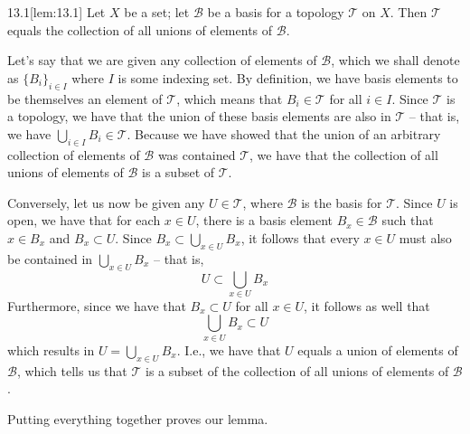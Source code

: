 \begin{thmBox}[Lemma]{13.1}[lem:13.1]
    Let \( X \) be a set; let \( \mathcal{B} \) be a basis for a topology 
    \( \mathcal{T} \) on \( X \). Then \( \mathcal{T} \) equals the collection 
    of all unions of elements of \( \mathcal{B} \). 

    \baseRule

    \begin{proofBox}
        Let's say that we are given any collection of elements of 
        \( \mathcal{B} \), which we shall denote as 
        \( \{ B_{ i } \}_{ i \in I } \) where \( I \) is some indexing set. 
        By definition, we have basis elements to be themselves an element of 
        \( \mathcal{T} \), which means that \( B_{ i } \in \mathcal{T} \) 
        for all \( i \in I \).
        Since \( \mathcal{T} \) is a topology, we have that the union of these 
        basis elements are also in \( \mathcal{T} \) -- that is, we have 
        \( \bigcup_{ i \in I } B_{ i } \in \mathcal{T} \).
        Because we have showed that the union of an arbitrary collection of 
        elements of \( \mathcal{B} \) was contained \( \mathcal{T} \), we have 
        that the collection of all unions of elements of \( \mathcal{B} \) is 
        a subset of \( \mathcal{T} \).
        
        \baseSkip 

        Conversely, let us now be given any \( U \in \mathcal{T} \), where 
        \( \mathcal{B} \) is the basis for \( \mathcal{T} \).
        Since \( U \) is open, we have that for each \( x \in U \), there is a 
        basis element \( B_{ x } \in \mathcal{B} \) such that 
        \( x \in B_{ x } \) and \( B_{ x } \subset U \).
        Since \( B_{ x } \subset \bigcup_{ x \in U } B_{ x } \), it follows 
        that every \( x \in U \) must also be contained in 
        \( \bigcup_{ x \in U } B_{ x } \) -- that is,
        \begin{equation*}
            U \subset \bigcup_{ x \in U } B_{ x }
        \end{equation*}
        Furthermore, since we have that \( B_{ x } \subset U \) for all 
        \( x \in U \), it follows as well that 
        \begin{equation*}
            \bigcup_{ x \in U } B_{ x } \subset U
        \end{equation*}
        which results in \( U = \bigcup_{ x \in U } B_{ x } \).
        I.e., we have that \( U \) equals a union of elements of 
        \( \mathcal{B} \), which tells us that \( \mathcal{T} \) is a subset of 
        the collection of all unions of elements of \( \mathcal{B} \).

        \baseSkip 

        Putting everything together proves our lemma.
    \end{proofBox}
\end{thmBox}

